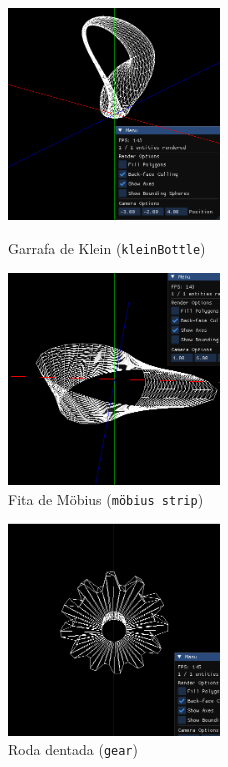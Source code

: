 \documentclass[12pt, a4paper]{article}
\begin{document}
\begin{figure}[H]
    \centering
    \begin{minipage}{0.48\textwidth}
        \centering
        \includegraphics[width=0.5\textwidth]{res/phase2/results/KleinBottle.png}
        \caption{Garrafa de Klein (\texttt{kleinBottle})}
    \end{minipage}\hfill
    \begin{minipage}{0.48\textwidth}
        \centering
        \includegraphics[width=0.5\textwidth]{res/phase2/results/MobiusStrip.png}
        \caption{Fita de Möbius (\texttt{möbius strip})}
    \end{minipage}
\end{figure}

\begin{figure}[H]
    \centering
    \begin{minipage}{0.48\textwidth}
        \centering
        \includegraphics[width=0.5\textwidth]{res/phase2/results/Gear.png}
        \caption{Roda dentada (\texttt{gear})}
    \end{minipage}\hfill
\end{figure}
\end{document}
